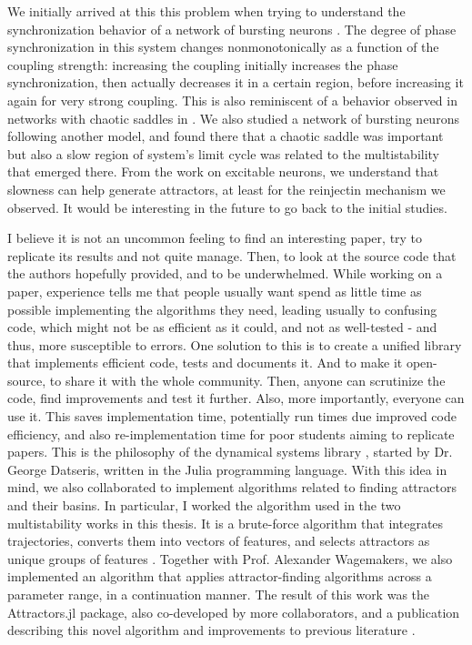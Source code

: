 We initially arrived at this this problem when trying to understand the synchronization behavior of a network of bursting neurons \cite{rossi2021phase}. The degree of phase synchronization in this system changes nonmonotonically as a function of the coupling strength: increasing the coupling initially increases the phase synchronization, then actually decreases it in a certain region, before increasing it again for very strong coupling. This is also reminiscent of a behavior observed in networks with chaotic saddles in \cite{medeiros2018boundaries}. We also studied a network of bursting neurons following another model, and found there that a chaotic saddle was important but also a slow region of system's limit cycle was related to the multistability that emerged there. From the work on excitable neurons, we understand that slowness can help generate attractors, at least for the reinjectin mechanism we observed. It would be interesting in the future to go back to the initial studies. 

I believe it is not an uncommon feeling to find an interesting paper, try to replicate its results and not quite manage. Then, to look at the source code that the authors hopefully provided, and to be underwhelmed. While working on a paper, experience tells me that people usually want spend as little time as possible implementing the algorithms they need, leading usually to confusing code, which might not be as efficient as it could, and not as well-tested - and thus, more susceptible to errors. 
One solution to this is to create a unified library that implements efficient code, tests and documents it. And to make it open-source, to share it with the whole community. Then, anyone can scrutinize the code, find improvements and test it further. Also, more importantly, everyone can use it. This saves implementation time, potentially run times due improved code efficiency, and also re-implementation time for poor students aiming to replicate papers. This is the philosophy of the dynamical systems library \cite{datseris2018dynamical}, started by Dr. George Datseris, written in the Julia programming language. With this idea in mind, we also collaborated to implement algorithms related to finding attractors and their basins. In particular, I worked the algorithm used in the two multistability works in this thesis. It is a brute-force algorithm that integrates trajectories, converts them into vectors of features, and selects attractors as unique groups of features \cite{gelbrecht2020monte, stender2021bstab, datseris2023framework}. Together with Prof. Alexander Wagemakers, we also implemented an algorithm that applies attractor-finding algorithms across a parameter range, in a continuation manner. The result of this work was the Attractors.jl package, also co-developed by more collaborators, and a publication describing this novel algorithm and improvements to previous literature \cite{datseris2023framework}.


